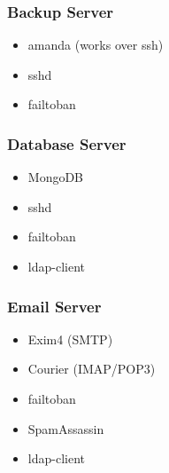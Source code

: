 		\subsubsection{Backup Server}		
		\begin{itemize}
			\item amanda (works over ssh)
			\item sshd
			\item failtoban
		\end{itemize}		
		\subsubsection{Database Server}
			\begin{itemize}
				\item MongoDB
				\item sshd
				\item failtoban
				\item ldap-client
			\end{itemize}
		\subsubsection{Email Server}
			\begin{itemize}
				\item Exim4 (SMTP)
				\item Courier (IMAP/POP3)
				\item failtoban
				\item SpamAssassin
				\item ldap-client
			\end{itemize}
		


		